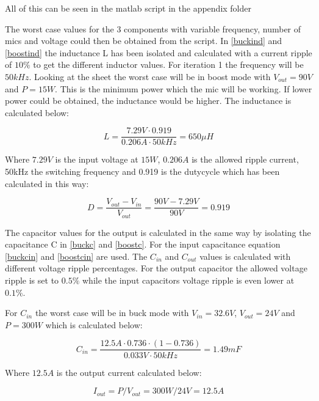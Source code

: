 All of this can be seen in the matlab script in the appendix folder  

The worst case values for the 3 components with variable frequency, number of mics and voltage could then be obtained from the script. 
In \ref{buckind} and \ref{boostind} the inductance L has been isolated and calculated with a current ripple of $10\%$ to get the different inductor values. For iteration 1 the frequency will be $50kHz$. Looking at the sheet the worst case will be in boost mode with $V_{out}=90V$ and $P=15W$. This is the minimum power which the mic will be working. If lower power could be obtained, the inductance would be higher. The inductance is calculated below:

\begin{equation}\label{buckind}
L = \frac{7.29V\cdot 0.919}{0.206A\cdot 50kHz} = 650\mu H
\end{equation} 

Where $7.29V$ is the input voltage at $15W$, $0.206A$ is the allowed ripple current, 50kHz the switching frequency and 0.919 is the dutycycle which has been calculated in this way:

\begin{equation} \label{boostD}
D = \frac{V_{out}-V_{in}}{V_{out}} = \frac{90V-7.29V}{90V} = 0.919
\end{equation} 

The capacitor values for the output is calculated in the same way by isolating the capacitance C in \ref{buckc} and \ref{boostc}. For the input capacitance equation \ref{buckcin} and \ref{boostcin} are used.
The $C_{in}$ and $C_{out}$ values is calculated with different voltage ripple percentages. For the output capacitor the allowed voltage ripple is set to $0.5\%$ while the input capacitors voltage ripple is even lower at $0.1\%$. 

For $C_{in}$ the worst case will be in buck mode with $V_{in}=32.6V$, $V_{out}=24V$ and $P=300W$ which is calculated below:

\begin{equation}
C_{in} = \frac{12.5A\cdot 0.736\cdot (1-0.736)}{0.033V\cdot 50kHz} = 1.49mF
\end{equation}    

Where $12.5A$ is the output current calculated below:

\begin{equation}
I_{out} = P/V_{out} = 300W/24V = 12.5A
\end{equation}

